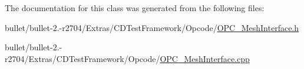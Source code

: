 The documentation for this class was generated from the following files\+:\begin{DoxyCompactItemize}
\item 
bullet/bullet-\/2.-\/r2704/\+Extras/\+C\+D\+Test\+Framework/\+Opcode/\hyperlink{_o_p_c___mesh_interface_8h}{O\+P\+C\+\_\+\+Mesh\+Interface.\+h}\item 
bullet/bullet-\/2.-\/r2704/\+Extras/\+C\+D\+Test\+Framework/\+Opcode/\hyperlink{_o_p_c___mesh_interface_8cpp}{O\+P\+C\+\_\+\+Mesh\+Interface.\+cpp}\end{DoxyCompactItemize}
